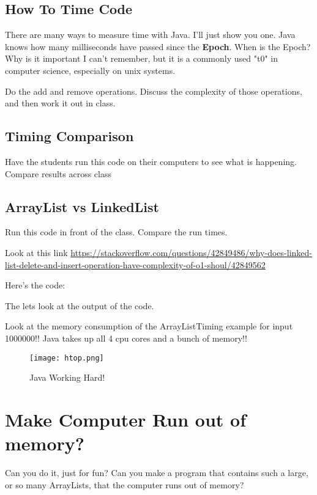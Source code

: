 \documentclass[12pt]{article}
\begin{document}
\subsection{How To Time Code}
There are many ways to measure time with Java. I'll just show you one. Java knows how many milliseconds have passed since the \textbf{Epoch}. When is the Epoch? Why is it important I can't remember, but it is a commonly used "t0" in computer science, especially on unix systems. 

Do the add and remove operations. Discuss the complexity of those operations, and then work it out in class.

\subsection{Timing Comparison}

Have the students run this code on their computers to see what is happening. Compare results across class



\subsection{ArrayList vs LinkedList}
Run this code in front of the class. Compare the run times.

Look at this link
\url{https://stackoverflow.com/questions/42849486/why-does-linked-list-delete-and-insert-operation-have-complexity-of-o1-shoul/42849562}

Here's the code:




The lets look at the output of the code.


Look at the memory consumption of the ArrayListTiming example for input 1000000!! Java takes up all 4 cpu cores and a bunch of memory!!

\begin{figure}[h]
  \centering
    \texttt{[image: htop.png]}
  \caption{Java Working Hard!}
\end{figure}


\section{Make Computer Run out of memory?}
Can you do it, just for fun? Can you make a program that contains such a large, or so many ArrayLists, that the computer runs out of memory?
\end{document}
